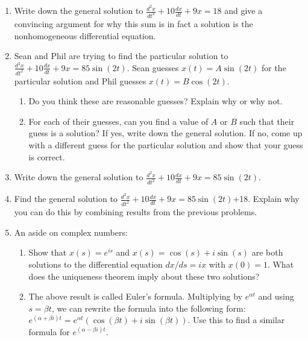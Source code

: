 \begin{enumerate}[resume]
\item Write down the general solution to $\displaystyle\frac{d^2x}{dt^2}+10\frac{dx}{dt}+9x=18$ and give a convincing argument for why this sum is in fact a solution is the nonhomogeneous differential equation. \label{13problem9} \vfill

\item Sean and Phil are trying to find the particular solution to $\displaystyle\frac{d^2x}{dt^2}+10\frac{dx}{dt}+9x=85\sin(2t)$. Sean guesses $x(t)=A\sin(2t)$ for the particular solution and Phil guesses $x(t)=B\cos(2t)$. \label{13problem10}

\begin{enumerate}
\item Do you think these are reasonable guesses? Explain why or why not. \label{13problem10parta} \vfill
\item For each of their guesses, can you find a value of $A$ or $B$ such that their guess is a solution? If yes, write down the general solution. If no, come up with a different guess for the particular solution and show that your guess is correct. \label{13problem10partb} \vfill
\end{enumerate}

\clearpage

\item Write down the general solution to $\displaystyle\frac{d^2x}{dt^2}+10\frac{dx}{dt}+9x=85\sin(2t)$. \label{13problem11} \vfill

\item Find the general solution to $\displaystyle\frac{d^2x}{dt^2}+10\frac{dx}{dt}+9x=85\sin(2t)$+18. Explain why you can do this by combining results from the previous problems. \label{13problem12} \vfill

\item An aside on complex numbers: \label{13problem13}
\begin{enumerate}
\item Show that $x(s) = e^{is}$ and $x(s) = \cos(s) + i\sin(s)$ are both solutions to the differential equation $dx/ds = ix$ with $x(0) = 1$.  What does the uniqueness theorem imply about these two solutions? \label{13problem13parta} \vfill
\item The above result is called Euler's formula. Multiplying by $e^{\alpha t}$ and using $s =\beta t$, we can rewrite the formula into the following form: $e^{(\alpha + \beta i )t} =  e^{\alpha t} (\cos(\beta t) + i\sin(\beta t))$. Use this to find a similar formula for $e^{(\alpha - \beta i) t}$. \label{13problem13partb} \vfill


\end{enumerate}
\end{enumerate}
